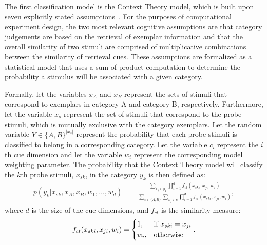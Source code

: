 \documentclass{article}
\begin{document}
The first classification model is the Context Theory model, which is built upon seven explicitly stated assumptions~\cite{medin78:pr}. For the purposes of computational experiment design, the two most relevant cognitive assumptions are that category judgements are based on the retrieval of exemplar information and that the overall similarity of two stimuli are comprised of multiplicative combinations between the similarity of retrieval cues. These assumptions are formalized as a statistical model that uses a sum of product computation to determine the probability a stimulus will be associated with a given category.

Formally, let the variables $x_A$ and $x_B$ represent the sets of stimuli that correspond to exemplars in category A and category B, respectively. Furthermore, let the variable $x_s$ represent the set of stimuli that correspond to the probe stimuli, which is mutually exclusive with the category exemplars. Let the random variable $Y \in \{A,B\}^{|x_s|}$ represent the probability that each probe stimuli is classified to belong in a corresponding category. Let the variable $c_i$ represent the $i$th cue dimension and let the variable $w_i$ represent the corresponding model weighting parameter. The probability that the Context Theory model will classify the $k$th probe stimuli, $x_{sk}$, in the category $y_k$ is then defined as:
\begin{align}
    p(y_k | x_{sk}, x_A, x_B, w_1, \dots, w_d) &= \frac{\sum\limits_{x_j \in y_1} \prod\limits_{i=1}^d f_{ct}(x_{ski}, x_{ji}, w_i)}{\sum\limits_{c \in \{A,B\}}\sum\limits_{x_j \in c} \prod\limits_{i=1}^d f_{ct}(x_{ski}, x_{ji}, w_i)}, \label{eq:ct_base}
\end{align}
where $d$ is the size of the cue dimensions, and $f_{ct}$ is the similarity measure:
\begin{align}
    f_{ct}(x_{ski}, x_{ji}, w_i) =
        \begin{dcases}
            1  , & \text{if } x_{ski} = x_{ji}\\
            w_i, & \text{otherwise}
        \end{dcases}.
\end{align}
\end{document}
